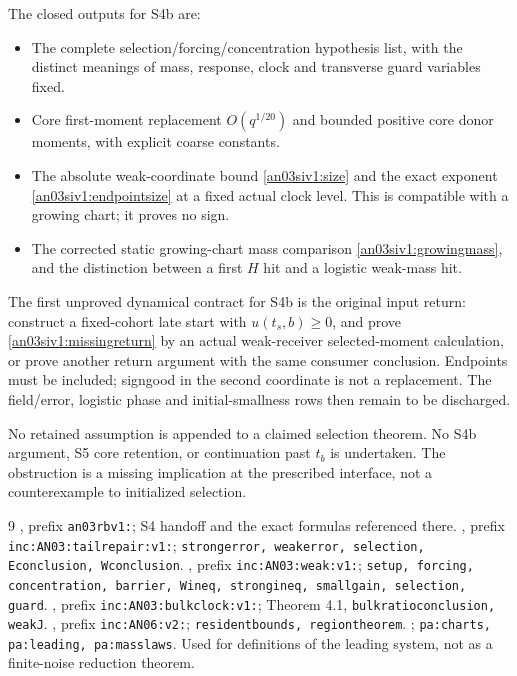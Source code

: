 \documentclass[11pt]{article}
\numberwithin{equation}{section}
\theoremstyle{remark}\newtheorem{remark}[proposition]{Remark}
\begin{document}
The closed outputs for S4b are:
\begin{itemize}
 \item The complete selection/forcing/concentration hypothesis list,
 with the distinct meanings of mass, response, clock and transverse
 guard variables fixed.
 \item Core first-moment replacement $O(q^{1/20})$ and bounded
 positive core donor moments, with explicit coarse constants.
 \item The absolute weak-coordinate bound \eqref{an03siv1:size} and
 the exact exponent \eqref{an03siv1:endpointsize} at a fixed actual
 clock level. This is compatible with a growing chart; it proves no sign.
 \item The corrected static growing-chart mass comparison
 \eqref{an03siv1:growingmass}, and the distinction between a first
 $H$ hit and a logistic weak-mass hit.
\end{itemize}
The first unproved dynamical contract for S4b is the original input
return: construct a fixed-cohort late start with $u(t_s,b)\ge0$,
and prove \eqref{an03siv1:missingreturn} by an actual weak-receiver
selected-moment calculation, or prove another return argument with
the same consumer conclusion. Endpoints must be included; signgood
in the second coordinate is not a replacement. The field/error,
logistic phase and initial-smallness rows then remain to be discharged.

No retained assumption is appended to a claimed selection theorem.
No S4b argument, S5 core retention, or continuation past $t_b$ is
undertaken. The obstruction is a missing implication at the prescribed
interface, not a counterexample to initialized selection.

\begin{thebibliography}{9}\small
{}, prefix
\texttt{an03rbv1:}; S4 handoff and the exact formulas referenced there.
,
prefix \texttt{inc:AN03:tailrepair:v1:};
\texttt{strongerror, weakerror, selection, Econclusion, Wconclusion}.
,
prefix \texttt{inc:AN03:weak:v1:};
\texttt{setup, forcing, concentration, barrier, Wineq, strongineq,
smallgain, selection, guard}.
,
prefix \texttt{inc:AN03:bulkclock:v1:}; Theorem 4.1,
\texttt{bulkratioconclusion, weakJ}.
,
prefix \texttt{inc:AN06:v2:}; \texttt{residentbounds, regiontheorem}.
;
\texttt{pa:charts, pa:leading, pa:masslaws}. Used for definitions of
the leading system, not as a finite-noise reduction theorem.
\end{thebibliography}
\end{document}
